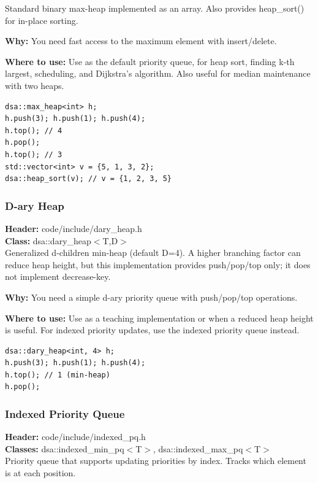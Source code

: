 \documentclass[11pt]{article}
\begin{document}
Standard binary max-heap implemented as an array. Also provides heap\_sort() for in-place sorting.

\textbf{Why:} You need fast access to the maximum element with insert/delete. \par \textbf{Where to use:} Use as the default priority queue, for heap sort, finding k-th largest, scheduling, and Dijkstra's algorithm. Also useful for median maintenance with two heaps.

\begin{lstlisting}
dsa::max_heap<int> h;
h.push(3); h.push(1); h.push(4);
h.top(); // 4
h.pop();
h.top(); // 3
std::vector<int> v = {5, 1, 3, 2};
dsa::heap_sort(v); // v = {1, 2, 3, 5}
\end{lstlisting}

\subsubsection{D-ary Heap}
\textbf{Header:} code/include/dary\_heap.h\\
\textbf{Class:} dsa::dary\_heap$<$T,D$>$\\

Generalized d-children min-heap (default D=4). A higher branching factor can reduce heap height, but this implementation provides push/pop/top only; it does not implement decrease-key.

\textbf{Why:} You need a simple d-ary priority queue with push/pop/top operations. \par \textbf{Where to use:} Use as a teaching implementation or when a reduced heap height is useful. For indexed priority updates, use the indexed priority queue instead.

\begin{lstlisting}
dsa::dary_heap<int, 4> h;
h.push(3); h.push(1); h.push(4);
h.top(); // 1 (min-heap)
h.pop();
\end{lstlisting}

\subsubsection{Indexed Priority Queue}
\textbf{Header:} code/include/indexed\_pq.h\\
\textbf{Classes:} dsa::indexed\_min\_pq$<$T$>$, dsa::indexed\_max\_pq$<$T$>$\\

Priority queue that supports updating priorities by index. Tracks which element is at each position.
\end{document}
